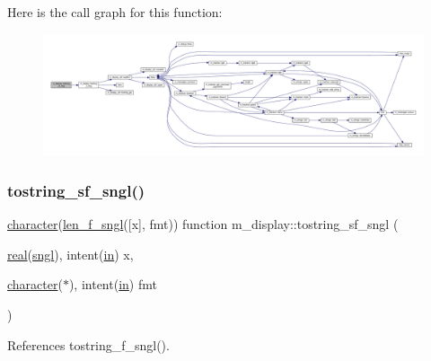 Here is the call graph for this function\+:
\nopagebreak
\begin{figure}[H]
\begin{center}
\leavevmode
\includegraphics[width=350pt]{namespacem__display_a833175a75a1f2563fb749394bc577196_cgraph}
\end{center}
\end{figure}
\mbox{\label{namespacem__display_a7767d9921f1509c55b3cae0cb7ba69b4}} 
\subsubsection{\texorpdfstring{tostring\+\_\+sf\+\_\+sngl()}{tostring\_sf\_sngl()}}
{\footnotesize\ttfamily \hyperlink{option__stopwatch_83_8txt_abd4b21fbbd175834027b5224bfe97e66}{character}(\hyperlink{namespacem__display_ae0feb946fbc4c31f8ba53e20719fa508}{len\+\_\+f\+\_\+sngl}(\mbox{[}x\mbox{]}, fmt)) function m\+\_\+display\+::tostring\+\_\+sf\+\_\+sngl (\begin{DoxyParamCaption}\item[{\hyperlink{read__watch_83_8txt_abdb62bde002f38ef75f810d3a905a823}{real}(\hyperlink{namespacem__display_a2ac86bc535c3ccc5947dbb3109c666b5}{sngl}), intent(\hyperlink{M__journal_83_8txt_afce72651d1eed785a2132bee863b2f38}{in})}]{x,  }\item[{\hyperlink{option__stopwatch_83_8txt_abd4b21fbbd175834027b5224bfe97e66}{character}($\ast$), intent(\hyperlink{M__journal_83_8txt_afce72651d1eed785a2132bee863b2f38}{in})}]{fmt }\end{DoxyParamCaption})\hspace{0.3cm}{\ttfamily [private]}}



References tostring\+\_\+f\+\_\+sngl().

